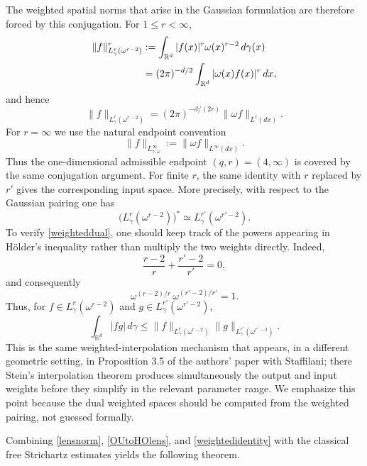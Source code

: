\documentclass[11pt,a4paper]{amsart}
\numberwithin{equation}{section}
\numberwithin{equation}{section}
\begin{document}
The weighted spatial norms that arise in the Gaussian formulation are therefore forced by this conjugation.  For $1\le r<\infty$,
\begin{align}
 \|f\|_{L^r_\gamma(\omega^{r-2})}^r
 &: =\int_{\mathbb R^d}|f(x)|^r\omega(x)^{r-2}\,d\gamma(x)\notag\\
 &=(2\pi)^{-d/2}\int_{\mathbb R^d}|\omega(x)f(x)|^r\,dx,
 \end{align}
and hence
\begin{equation}\label{weightedidentity}
 \|f\|_{L^r_\gamma(\omega^{r-2})}
 =(2\pi)^{-d/(2r)}\|\omega f\|_{L^r(dx)}.
\end{equation}
For $r=\infty$ we use the natural endpoint convention
\begin{equation}\label{weightedidentityInfinity}
 \|f\|_{L^\infty_{\gamma,\omega}}:=\|\omega f\|_{L^\infty(dx)}.
\end{equation}
Thus the one-dimensional admissible endpoint $(q,r)=(4,\infty)$ is covered by the same conjugation argument.  For finite $r$, the same identity with $r$ replaced by $r'$ gives the corresponding input space.  More precisely, with respect to the Gaussian pairing one has
\begin{equation}\label{weighteddual}
\bigl(L^r_\gamma(\omega^{r-2})\bigr)^*\simeq L^{r'}_\gamma(\omega^{r'-2}).
\end{equation}
To verify \eqref{weighteddual}, one should keep track of the powers appearing in H\"older's inequality rather than multiply the two weights directly.  Indeed,
\[
 \frac{r-2}{r}+\frac{r'-2}{r'}=0,
\]
and consequently
\[
 \omega^{(r-2)/r}\,\omega^{(r'-2)/r'}=1.
\]
Thus, for $f\in L^r_\gamma(\omega^{r-2})$ and $g\in L^{r'}_\gamma(\omega^{r'-2})$,
\[
 \int_{\mathbb R^d}|fg|\,d\gamma
 \leq
 \|f\|_{L^r_\gamma(\omega^{r-2})}
 \|g\|_{L^{r'}_\gamma(\omega^{r'-2})}.
\]
This is the same weighted-interpolation mechanism that appears, in a different geometric setting, in Proposition 3.5 of the authors' paper with Staffilani; there Stein's interpolation theorem produces simultaneously the output and input weights before they simplify in the relevant parameter range.  We emphasize this point because the dual weighted spaces should be computed from the weighted pairing, not guessed formally.

Combining \eqref{lensnorm}, \eqref{OUtoHOlens}, and \eqref{weightedidentity} with the classical free Strichartz estimates yields the following theorem.
\end{document}
